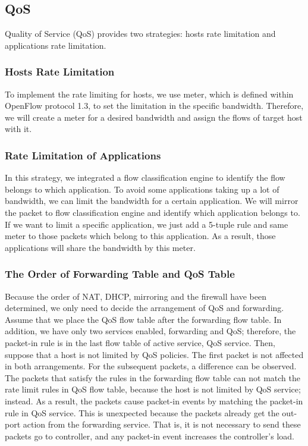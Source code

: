 \documentclass[conference]{IEEEtran}
\begin{document}
\subsection{QoS}
Quality of Service (QoS) provides two strategies: hosts rate limitation and applications rate limitation.

\subsubsection{Hosts Rate Limitation}
To implement the rate limiting for hosts, we use meter, which is defined within OpenFlow protocol 1.3, to set the limitation in the specific bandwidth. Therefore, we will create a meter for a desired bandwidth and assign the flows of target host with it.


\subsubsection{Rate Limitation of Applications}

In this strategy, we integrated a flow classification engine \cite{che-chuan-apnoms} to identify the flow belongs to which application.
To avoid some applications taking up a lot of bandwidth, we can limit the bandwidth for a certain application.
We will mirror the packet to flow classification engine and identify which application belongs to.
If we want to limit a specific application, we just add a 5-tuple rule and same meter to those packets which belong to this application.
As a result, those applications will share the bandwidth by this meter.

\subsubsection{The Order of Forwarding Table and QoS Table}
Because the order of NAT, DHCP, mirroring and the firewall have been determined, we only need to decide the arrangement of QoS and forwarding. Assume that we place the QoS flow table after the forwarding flow table. In addition, we have only two services enabled, forwarding and QoS; therefore, the packet-in rule is in the last flow table of active service, QoS service. Then, suppose that a host is not limited by QoS policies. The first packet is not affected in both arrangements. For the subsequent packets, a difference can be observed. The packets that satisfy the rules in the forwarding flow table can not match the rate limit rules in QoS flow table, because the host is not limited by QoS service; instead. As a result, the packets cause packet-in events by matching the packet-in rule in QoS service. This is unexpected because the packets already get the out-port action from the forwarding service. That is, it is not necessary to send these packets go to controller, and any packet-in event increases the controller’s load.
\end{document}
